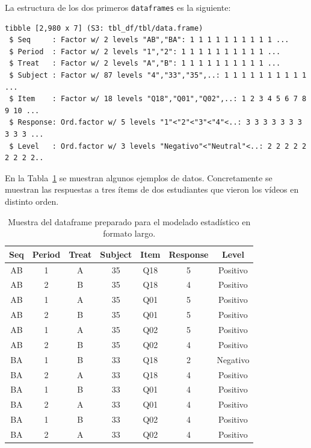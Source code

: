 \documentclass[
  12pt,
  a4paper,
  extrafontsizes,
  onecolumn,
  openright,
  table]{memoir}
\begin{document}
\clearpage

La estructura de los dos primeros \texttt{dataframes} es la siguiente:

\begin{verbatim}
tibble [2,980 x 7] (S3: tbl_df/tbl/data.frame)
 $ Seq     : Factor w/ 2 levels "AB","BA": 1 1 1 1 1 1 1 1 1 1 ...
 $ Period  : Factor w/ 2 levels "1","2": 1 1 1 1 1 1 1 1 1 1 ...
 $ Treat   : Factor w/ 2 levels "A","B": 1 1 1 1 1 1 1 1 1 1 ...
 $ Subject : Factor w/ 87 levels "4","33","35",..: 1 1 1 1 1 1 1 1 1 1 ...
 $ Item    : Factor w/ 18 levels "Q18","Q01","Q02",..: 1 2 3 4 5 6 7 8 9 10 ...
 $ Response: Ord.factor w/ 5 levels "1"<"2"<"3"<"4"<..: 3 3 3 3 3 3 3 3 3 3 ...
 $ Level   : Ord.factor w/ 3 levels "Negativo"<"Neutral"<..: 2 2 2 2 2 2 2 2 2..
\end{verbatim}

En la Tabla~\ref{tbl-df_response} se muestran algunos ejemplos de datos.
Concretamente se muestran las respuestas a tres ítems de dos estudiantes
que vieron los vídeos en distinto orden.

\hypertarget{tbl-df_response}{}
\begin{longtable}{ccccccc}
\caption{\label{tbl-df_response}Muestra del dataframe preparado para el modelado estadístico en formato
largo. }\tabularnewline

\toprule
Seq & Period & Treat & Subject & Item & Response & Level \\ 
\midrule
AB & 1 & A & 35 & Q18 & 5 & Positivo \\ 
AB & 2 & B & 35 & Q18 & 4 & Positivo \\ 
AB & 1 & A & 35 & Q01 & 5 & Positivo \\ 
AB & 2 & B & 35 & Q01 & 5 & Positivo \\ 
AB & 1 & A & 35 & Q02 & 5 & Positivo \\ 
AB & 2 & B & 35 & Q02 & 4 & Positivo \\ 
BA & 1 & B & 33 & Q18 & 2 & Negativo \\ 
BA & 2 & A & 33 & Q18 & 4 & Positivo \\ 
BA & 1 & B & 33 & Q01 & 4 & Positivo \\ 
BA & 2 & A & 33 & Q01 & 4 & Positivo \\ 
BA & 1 & B & 33 & Q02 & 4 & Positivo \\ 
BA & 2 & A & 33 & Q02 & 4 & Positivo \\ 
\bottomrule
\end{longtable}

\end{document}

